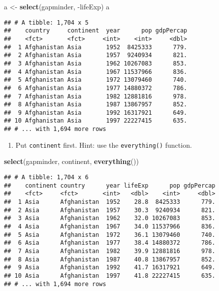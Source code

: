 \documentclass[]{article}
\newenvironment{Shaded}{\begin{snugshade}}{\end{snugshade}}
\newcommand{\KeywordTok}[1]{\textcolor[rgb]{0.13,0.29,0.53}{\textbf{{#1}}}}
\newcommand{\StringTok}[1]{\textcolor[rgb]{0.31,0.60,0.02}{{#1}}}
\newcommand{\NormalTok}[1]{{#1}}
\providecommand{\tightlist}{%
  \setlength{\itemsep}{0pt}\setlength{\parskip}{0pt}}
\begin{document}
\begin{Shaded}
\begin{Highlighting}[]
\NormalTok{a <-}\StringTok{ }\KeywordTok{select}\NormalTok{(gapminder, -lifeExp)}
\NormalTok{a}
\end{Highlighting}
\end{Shaded}

\begin{verbatim}
## # A tibble: 1,704 x 5
##    country     continent  year      pop gdpPercap
##    <fct>       <fct>     <int>    <int>     <dbl>
##  1 Afghanistan Asia       1952  8425333      779.
##  2 Afghanistan Asia       1957  9240934      821.
##  3 Afghanistan Asia       1962 10267083      853.
##  4 Afghanistan Asia       1967 11537966      836.
##  5 Afghanistan Asia       1972 13079460      740.
##  6 Afghanistan Asia       1977 14880372      786.
##  7 Afghanistan Asia       1982 12881816      978.
##  8 Afghanistan Asia       1987 13867957      852.
##  9 Afghanistan Asia       1992 16317921      649.
## 10 Afghanistan Asia       1997 22227415      635.
## # ... with 1,694 more rows
\end{verbatim}

\begin{enumerate}
\def\labelenumi{\arabic{enumi}.}
\setcounter{enumi}{3}
\tightlist
\item
  Put \texttt{continent} first. Hint: use the \texttt{everything()}
  function.
\end{enumerate}

\begin{Shaded}
\begin{Highlighting}[]
\KeywordTok{select}\NormalTok{(gapminder, continent, }\KeywordTok{everything}\NormalTok{())}
\end{Highlighting}
\end{Shaded}

\begin{verbatim}
## # A tibble: 1,704 x 6
##    continent country      year lifeExp      pop gdpPercap
##    <fct>     <fct>       <int>   <dbl>    <int>     <dbl>
##  1 Asia      Afghanistan  1952    28.8  8425333      779.
##  2 Asia      Afghanistan  1957    30.3  9240934      821.
##  3 Asia      Afghanistan  1962    32.0 10267083      853.
##  4 Asia      Afghanistan  1967    34.0 11537966      836.
##  5 Asia      Afghanistan  1972    36.1 13079460      740.
##  6 Asia      Afghanistan  1977    38.4 14880372      786.
##  7 Asia      Afghanistan  1982    39.9 12881816      978.
##  8 Asia      Afghanistan  1987    40.8 13867957      852.
##  9 Asia      Afghanistan  1992    41.7 16317921      649.
## 10 Asia      Afghanistan  1997    41.8 22227415      635.
## # ... with 1,694 more rows
\end{verbatim}
\end{document}
